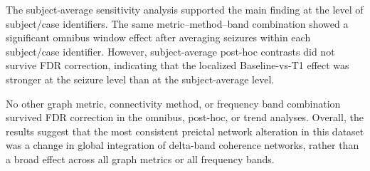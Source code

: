 The subject-average sensitivity analysis supported the main finding at the
level of subject/case identifiers. The same metric--method--band combination
showed a significant omnibus window effect after averaging seizures within each
subject/case identifier. However, subject-average post-hoc contrasts did not
survive FDR correction, indicating that the localized Baseline-vs-T1 effect was
stronger at the seizure level than at the subject-average level.

No other graph metric, connectivity method, or frequency band combination
survived FDR correction in the omnibus, post-hoc, or trend analyses. Overall,
the results suggest that the most consistent preictal network alteration in this
dataset was a change in global integration of delta-band coherence networks,
rather than a broad effect across all graph metrics or all frequency bands.